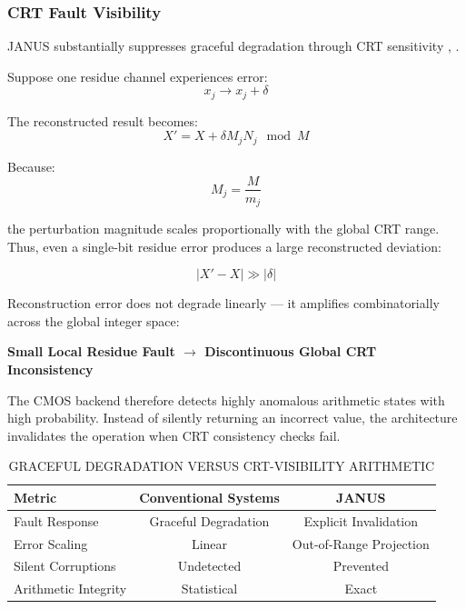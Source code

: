 \documentclass[journal]{IEEEtran}
\begin{document}
\subsubsection{\textbf{CRT Fault Visibility}}

JANUS substantially suppresses graceful degradation through CRT sensitivity \cite{Xia2000}, \cite{Barsi1973,Yang2002}.

Suppose one residue channel experiences error:
\begin{equation}
x_j \rightarrow x_j + \delta
\end{equation}

The reconstructed result becomes:
\begin{equation}
X ' = X + \delta M_j N_j \mod M
\end{equation}

Because:
\begin{equation}
M_j = \frac{M}{m_j}
\end{equation}

the perturbation magnitude scales proportionally with the global CRT range. Thus, even a single-bit residue error produces a large reconstructed deviation:

\begin{equation}
|X ' - X| \gg |\delta| 
\end{equation}

Reconstruction error does not degrade linearly --- it amplifies combinatorially across the global integer space:

\begin{center}
\textbf{Small Local Residue Fault $\rightarrow$ Discontinuous Global CRT Inconsistency}
\end{center}

The CMOS backend therefore detects highly anomalous arithmetic states with high probability. Instead of silently returning an incorrect value, the architecture invalidates the operation when CRT consistency checks fail.

\begin{table}[htbp]
\centering
\small
\setlength{\tabcolsep}{3pt}
\caption{GRACEFUL DEGRADATION VERSUS CRT-VISIBILITY ARITHMETIC}
\label{tab:table9}
\begin{tabular}{lcc}
\toprule
Metric & Conventional Systems & JANUS \\
\midrule
Fault Response & Graceful Degradation & Explicit Invalidation \\
Error Scaling & Linear & Out-of-Range Projection \\
Silent Corruptions & Undetected & Prevented \\
Arithmetic Integrity & Statistical & Exact \\
\bottomrule
\end{tabular}
\end{table}
\end{document}
